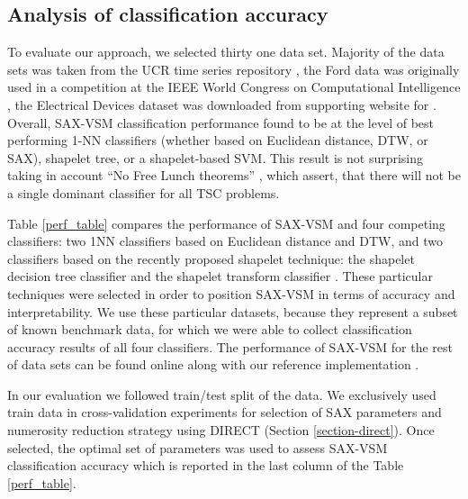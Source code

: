 \documentclass{llncs}
\begin{document}
\subsection{Analysis of classification accuracy}
To evaluate our approach, we selected thirty one data set. Majority of the data sets was taken 
from the UCR time series repository \cite{ucr}, the Ford data was originally used in a competition
at the IEEE World Congress on Computational Intelligence \cite{ford}, the Electrical Devices
dataset was downloaded from supporting website for \cite{bagnal}. Overall, SAX-VSM classification 
performance found to be at the level of best performing 1-NN classifiers (whether based on 
Euclidean distance, DTW, or SAX), shapelet tree, or a shapelet-based SVM. 
This result is not surprising taking in account ``No Free Lunch theorems'' \cite{nfl}, which 
assert, that there will not be a single dominant classifier for all TSC problems.

Table \ref{perf_table} compares the performance of SAX-VSM and four competing classifiers: 
two 1NN classifiers based on Euclidean distance and DTW, and two classifiers 
based on the recently proposed shapelet technique: the shapelet decision tree \cite{shapelet}
classifier and the shapelet transform classifier \cite{bagnal}. These particular techniques were
selected in order to position SAX-VSM in terms of accuracy and interpretability. 
We use these particular datasets, because they represent a subset of known benchmark data, 
for which we were able to collect classification accuracy results of all four classifiers. 
The performance of SAX-VSM for the rest of data sets can be found online along with 
our reference implementation \cite{jmotif}.

In our evaluation we followed train/test split of the data. We exclusively used train data in 
cross-validation experiments for selection of SAX parameters and numerosity reduction strategy
using DIRECT (Section \ref{section-direct}). Once selected, the optimal set of parameters 
was used to assess SAX-VSM classification accuracy which is reported in the last column 
of the Table \ref{perf_table}.
\end{document}
